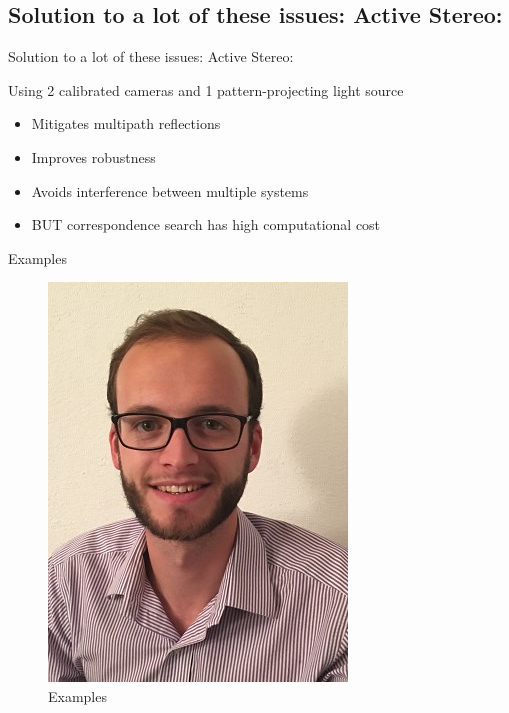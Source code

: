 \subsection{Solution to a lot of these issues: Active Stereo:}
\begin{frame}{Solution to a lot of these issues: Active Stereo:}

Using 2 calibrated cameras and 1 pattern-projecting light source

\begin{itemize}
\item Mitigates multipath reflections
\item Improves robustness
\item Avoids interference between multiple systems\\
\item BUT correspondence search has high computational cost
\end{itemize}

\end{frame}

\begin{frame}{Examples}
\begin{figure}
\includegraphics[scale=0.9]{pictures/polop}
\caption{Examples}
\end{figure}
\end{frame}

